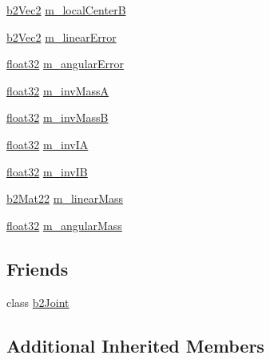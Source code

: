 \begin{DoxyCompactItemize}
\item 
\mbox{\hyperlink{structb2_vec2}{b2\+Vec2}} \mbox{\hyperlink{classb2_motor_joint_a8ba1cf76d5cbc10bf6ff9b7685ebc20d}{m\+\_\+local\+CenterB}}
\item 
\mbox{\hyperlink{structb2_vec2}{b2\+Vec2}} \mbox{\hyperlink{classb2_motor_joint_a21d38a7fedf735aca7d36d1ec033337e}{m\+\_\+linear\+Error}}
\item 
\mbox{\hyperlink{b2_settings_8h_aacdc525d6f7bddb3ae95d5c311bd06a1}{float32}} \mbox{\hyperlink{classb2_motor_joint_a76fd4aa158014c7fd653ca47c0e3c50a}{m\+\_\+angular\+Error}}
\item 
\mbox{\hyperlink{b2_settings_8h_aacdc525d6f7bddb3ae95d5c311bd06a1}{float32}} \mbox{\hyperlink{classb2_motor_joint_a24154e990c9c6cda65989b2828d27c1a}{m\+\_\+inv\+MassA}}
\item 
\mbox{\hyperlink{b2_settings_8h_aacdc525d6f7bddb3ae95d5c311bd06a1}{float32}} \mbox{\hyperlink{classb2_motor_joint_a85aff034d88bd4dcf6ab0aea28df84cb}{m\+\_\+inv\+MassB}}
\item 
\mbox{\hyperlink{b2_settings_8h_aacdc525d6f7bddb3ae95d5c311bd06a1}{float32}} \mbox{\hyperlink{classb2_motor_joint_a873dc8487f43a0d9ec890e3f023efe26}{m\+\_\+inv\+IA}}
\item 
\mbox{\hyperlink{b2_settings_8h_aacdc525d6f7bddb3ae95d5c311bd06a1}{float32}} \mbox{\hyperlink{classb2_motor_joint_a2d67befa1f4404c03cacb918f4679a48}{m\+\_\+inv\+IB}}
\item 
\mbox{\hyperlink{structb2_mat22}{b2\+Mat22}} \mbox{\hyperlink{classb2_motor_joint_a89503b91fd38d332304092661aafd2c0}{m\+\_\+linear\+Mass}}
\item 
\mbox{\hyperlink{b2_settings_8h_aacdc525d6f7bddb3ae95d5c311bd06a1}{float32}} \mbox{\hyperlink{classb2_motor_joint_a3718dc3784fb4f09ecf42d28c9896ecc}{m\+\_\+angular\+Mass}}
\end{DoxyCompactItemize}
\subsection*{Friends}
\begin{DoxyCompactItemize}
\item 
class \mbox{\hyperlink{classb2_motor_joint_a54ade8ed3d794298108d7f4c4e4793fa}{b2\+Joint}}
\end{DoxyCompactItemize}
\subsection*{Additional Inherited Members}



